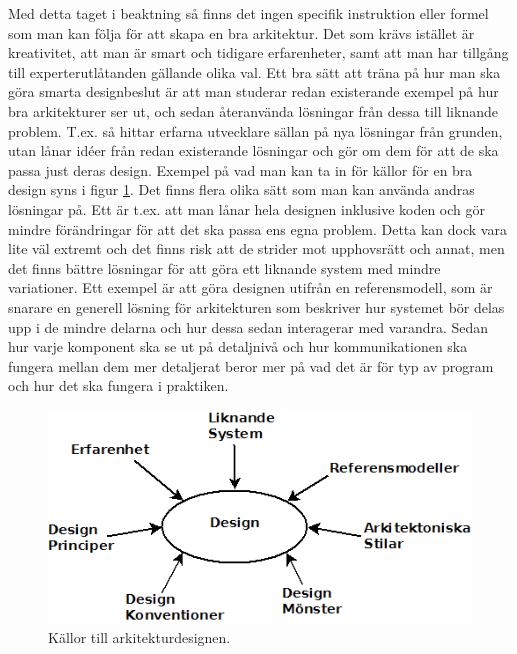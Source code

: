 Med detta taget i beaktning så finns det ingen specifik instruktion eller formel som man kan följa för att skapa en bra arkitektur. Det som krävs istället är kreativitet, att man är smart och tidigare erfarenheter, samt att man har tillgång till experterutlåtanden gällande olika val.
\newline
\newline
Ett bra sätt att träna på hur man ska göra smarta designbeslut är att man studerar redan existerande exempel på hur bra arkitekturer ser ut, och sedan återanvända lösningar från dessa till liknande problem. T.ex. så hittar erfarna utvecklare sällan på nya lösningar från grunden, utan lånar idéer från redan existerande lösningar och gör om dem för att de ska passa just deras design. Exempel på vad man kan ta in för källor för en bra design syns i figur \ref{fig:des}.
\newline
\newline
Det finns flera olika sätt som man kan använda andras lösningar på. Ett är t.ex. att man lånar hela designen inklusive koden och gör mindre förändringar för att det ska passa ens egna problem. Detta kan dock vara lite väl extremt och det finns risk att de strider mot upphovsrätt och annat, men det finns bättre lösningar för att göra ett liknande system med mindre variationer. Ett exempel är att göra designen utifrån en referensmodell, som är snarare en generell lösning för arkitekturen som beskriver hur systemet bör delas upp i de mindre delarna och hur dessa sedan interagerar med varandra. Sedan hur varje komponent ska se ut på detaljnivå och hur kommunikationen ska fungera mellan dem mer detaljerat beror mer på vad det är för typ av program och hur det ska fungera i praktiken.

\begin{figure}[h]
\centerline{\includegraphics[scale=0.6]{sebastian-tex/grafik/designadvice.png}}
\caption{Källor till arkitekturdesignen.}
\label{fig:des}
\end{figure}

